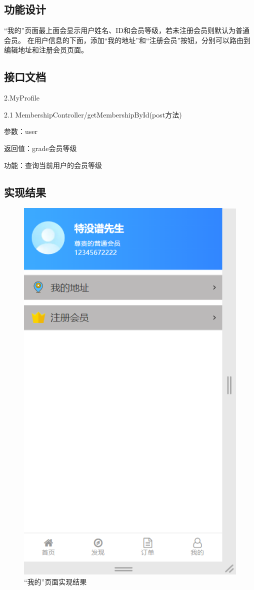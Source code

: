 \subsection{功能设计}
“我的”页面最上面会显示用户姓名、ID和会员等级，若未注册会员则默认为普通会员。
在用户信息的下面，添加“我的地址”和“注册会员”按钮，分别可以路由到编辑地址和注册会员页面。~\\

\subsection{接口文档}
2.MyProfile

2.1 MembershipController/getMembershipById(post方法)

参数：user

返回值：grade会员等级

功能：查询当前用户的会员等级~\\

\subsection{实现结果}
\begin{figure}[H]
    \centering
    \includegraphics[scale=0.5]{figures/5.1.3.png}
    \caption{“我的”页面实现结果}
\end{figure}

